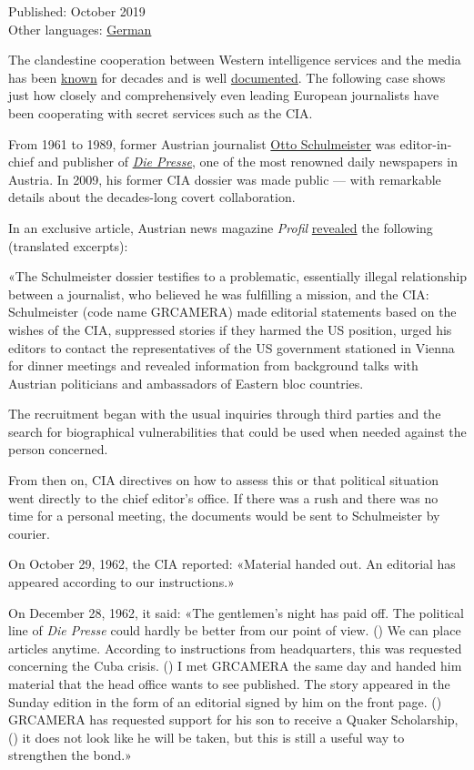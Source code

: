 Published: October 2019\\
Other languages:
\href{https://swprs.org/der-chefredakteur-und-die-cia/}{German}

The clandestine cooperation between Western intelligence services and
the media has been
\href{http://carlbernstein.com/magazine_cia_and_media.php}{known} for
decades and is well
\href{https://swprs.org/video-the-cia-and-the-media/}{documented}. The
following case shows just how closely and comprehensively even leading
European journalists have been cooperating with secret services such as
the CIA.

From 1961 to 1989, former Austrian journalist
\href{https://en.wikipedia.org/wiki/Otto_Schulmeister}{Otto
Schulmeister} was editor-in-chief and publisher of
\href{https://en.wikipedia.org/wiki/Die_Presse}{\emph{Die Presse}}, one
of the most renowned daily newspapers in Austria. In 2009, his former
CIA dossier was made public --- with remarkable details about the
decades-long covert collaboration.

In an exclusive article, Austrian news magazine \emph{Profil}
\href{https://www.profil.at/home/ex-presse-chef-dienste-cia-otto-schulmeister-geheimdienst-239634}{revealed}
the following (translated excerpts):

«The Schulmeister dossier testifies to a problematic, essentially
illegal relationship between a journalist, who believed he was
fulfilling a mission, and the CIA: Schulmeister (code name GRCAMERA)
made editorial statements based on the wishes of the CIA, suppressed
stories if they harmed the US position, urged his editors to contact the
representatives of the US government stationed in Vienna for dinner
meetings and revealed information from background talks with Austrian
politicians and ambassadors of Eastern bloc countries.

The recruitment began with the usual inquiries through third parties and
the search for biographical vulnerabilities that could be used when
needed against the person concerned.

From then on, CIA directives on how to assess this or that political
situation went directly to the chief editor's office. If there was a
rush and there was no time for a personal meeting, the documents would
be sent to Schulmeister by courier.

On October 29, 1962, the CIA reported: «Material handed out. An
editorial has appeared according to our instructions.»

On December 28, 1962, it said: «The gentlemen's night has paid off. The
political line of \emph{Die Presse} could hardly be better from our
point of view. () We can place articles anytime. According to
instructions from headquarters, this was requested concerning the Cuba
crisis. () I met GRCAMERA the same day and handed him material that the
head office wants to see published. The story appeared in the Sunday
edition in the form of an editorial signed by him on the front page. ()
GRCAMERA has requested support for his son to receive a Quaker
Scholarship, () it does not look like he will be taken, but this is
still a useful way to strengthen the bond.»


